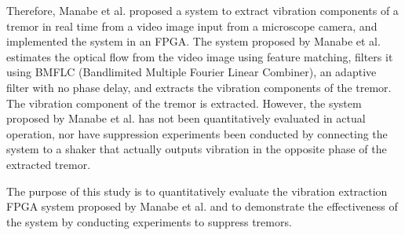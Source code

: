 
Therefore, Manabe et al. proposed a system to extract vibration components of a tremor in real time from a video image input from a microscope camera, and implemented the system in an FPGA.
The system proposed by Manabe et al. estimates the optical flow from the video image using feature matching,
filters it using BMFLC (Bandlimited Multiple Fourier Linear Combiner)\cite{bib:BMFLC},
an adaptive filter with no phase delay, and extracts the vibration components of the tremor.
The vibration component of the tremor is extracted. However, the system proposed by Manabe et al. has not been quantitatively evaluated in actual operation,
nor have suppression experiments been conducted by connecting the system to a shaker that actually outputs vibration in the opposite phase of the extracted tremor.

 


The purpose of this study is to quantitatively evaluate the vibration extraction FPGA system proposed by Manabe et al.
and to demonstrate the effectiveness of the system by conducting experiments to suppress tremors.
 



